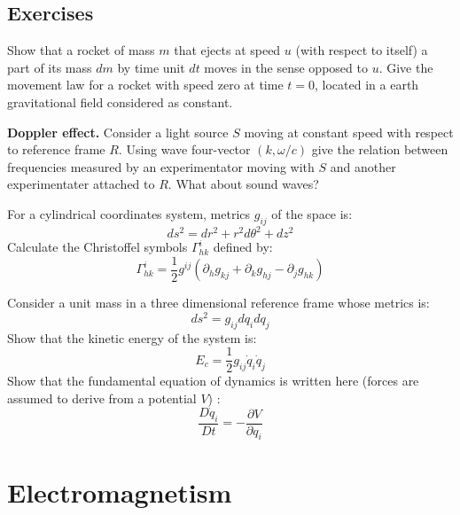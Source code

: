 \documentclass[12pt]{book}
\begin{document}
\section{Exercises}
\begin{exo}
Show that a rocket of mass $m$ that ejects at speed $u$ (with respect to
itself) a part of its mass $dm$ by time unit $dt$ moves in the sense opposed
to $u$. Give the movement law for a rocket with speed zero at time $t=0$,
located in a earth gravitational field considered as constant. 
\end{exo}

\begin{exo}
{\bf Doppler effect.} Consider a light source $S$ moving at constant speed
with respect to reference frame $R$. Using wave four-vector $(k,\omega/c)$ give
the relation between frequencies measured by an experimentator moving with $S$
and another experimentater attached to $R$. What about sound waves?
\end{exo}

\begin{exo}
For a cylindrical coordinates system, metrics $g_{ij}$ of the space is:
\begin{equation}
ds^2=dr^2+r^2d\theta^2+dz^2
\end{equation}
Calculate the Christoffel symbols $\Gamma^{i}_{hk}$ defined by:
\begin{equation}
\Gamma^{i}_{hk}=\frac{1}{2}g^{ij} (\partial_hg_{kj}+ \partial_kg_{hj}-
\partial_jg_{hk})
\end{equation}
\end{exo}
\begin{exo}
Consider a unit mass in a three dimensional reference frame whose metrics is:
\begin{equation}
ds^2=g_{ij}dq_idq_j
\end{equation}
Show that the kinetic energy of the system is:
\begin{equation}
E_c=\frac{1}{2}g_{ij}\dot q_i\dot q_j
\end{equation}
Show that the fundamental equation of dynamics is written here (forces are
assumed to derive from a potential $V$) :
\begin{equation}
\frac{D\dot q_i}{Dt}=-\frac{\partial V}{\partial q_i}
\end{equation}
\end{exo}

\chapter{Electromagnetism}\label{chapelectromag}
\end{document}
